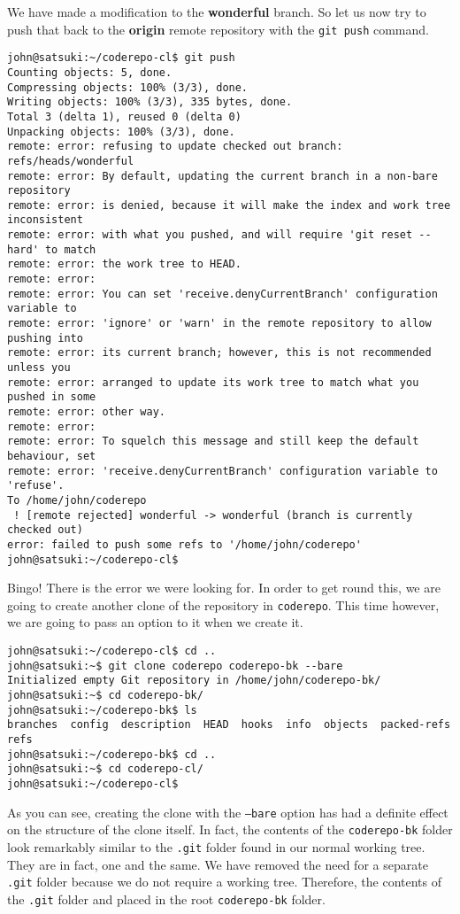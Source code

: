 We have made a modification to the \textbf{wonderful} branch.  So let us now try to push that back to the \textbf{origin} remote repository with the \texttt{git push} command.
 
\begin{Verbatim}[frame=leftline,framerule=1mm,fontsize=\relsize{-3}] 
john@satsuki:~/coderepo-cl$ git push
Counting objects: 5, done.
Compressing objects: 100% (3/3), done.
Writing objects: 100% (3/3), 335 bytes, done.
Total 3 (delta 1), reused 0 (delta 0)
Unpacking objects: 100% (3/3), done.
remote: error: refusing to update checked out branch: refs/heads/wonderful
remote: error: By default, updating the current branch in a non-bare repository
remote: error: is denied, because it will make the index and work tree inconsistent
remote: error: with what you pushed, and will require 'git reset --hard' to match
remote: error: the work tree to HEAD.
remote: error: 
remote: error: You can set 'receive.denyCurrentBranch' configuration variable to
remote: error: 'ignore' or 'warn' in the remote repository to allow pushing into
remote: error: its current branch; however, this is not recommended unless you
remote: error: arranged to update its work tree to match what you pushed in some
remote: error: other way.
remote: error: 
remote: error: To squelch this message and still keep the default behaviour, set
remote: error: 'receive.denyCurrentBranch' configuration variable to 'refuse'.
To /home/john/coderepo
 ! [remote rejected] wonderful -> wonderful (branch is currently checked out)
error: failed to push some refs to '/home/john/coderepo'
john@satsuki:~/coderepo-cl$ 
\end{Verbatim}

Bingo!  There is the error we were looking for.  In order to get round this, we are going to create another clone of the repository in \texttt{coderepo}.  This time however, we are going to pass an option to it when we create it.

\begin{Verbatim}[frame=leftline,framerule=1mm,fontsize=\relsize{-3}] 
john@satsuki:~/coderepo-cl$ cd ..
john@satsuki:~$ git clone coderepo coderepo-bk --bare
Initialized empty Git repository in /home/john/coderepo-bk/
john@satsuki:~$ cd coderepo-bk/
john@satsuki:~/coderepo-bk$ ls
branches  config  description  HEAD  hooks  info  objects  packed-refs  refs
john@satsuki:~/coderepo-bk$ cd ..
john@satsuki:~$ cd coderepo-cl/
john@satsuki:~/coderepo-cl$ 
\end{Verbatim}

As you can see, creating the clone with the \texttt{--bare} option has had a definite effect on the structure of the clone itself.  In fact, the contents of the \texttt{coderepo-bk} folder look remarkably similar to the \texttt{.git} folder found in our normal working tree.  They are in fact, one and the same.  We have removed the need for a separate \texttt{.git} folder because we do not require a working tree.  Therefore, the contents of the \texttt{.git} folder and placed in the root \texttt{coderepo-bk} folder.

